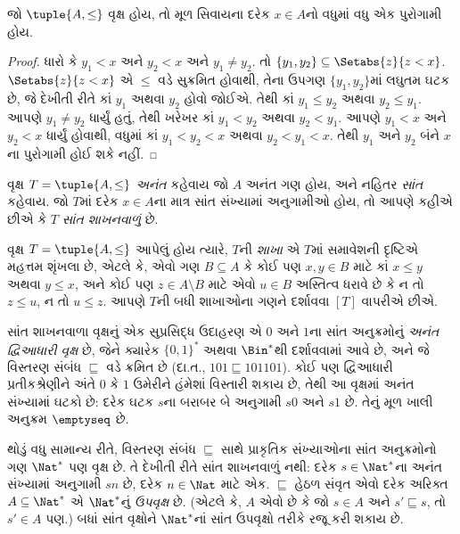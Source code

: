 \documentclass[../../../include/open-logic-section]{subfiles}
\begin{document}
\begin{prop}
જો $\tuple{A,\le}$ વૃક્ષ હોય, તો મૂળ સિવાયના
દરેક $x \in A$નો વધુમાં વધુ એક પુરોગામી હોય.
\end{prop}

\begin{proof}
  ધારો કે $y_1 < x$ અને $y_2 < x$ અને $y_1 \neq y_2$.
  તો $\{y_1, y_2\} \subseteq \Setabs{z}{z<x}$.
  $\Setabs{z}{z<x}$ એ $\le$ વડે સુક્રમિત હોવાથી,
  તેના ઉપગણ $\{y_1, y_2\}$માં લઘુતમ ઘટક છે,
  જે દેખીતી રીતે કાં $y_1$ અથવા $y_2$ હોવો જોઈએ.
  તેથી કાં $y_1 \le y_2$ અથવા $y_2 \le y_1$.
  આપણે $y_1 \neq y_2$ ધાર્યું હતું, તેથી ખરેખર
  કાં $y_1 < y_2$ અથવા $y_2 < y_1$.
  આપણે $y_1 < x$ અને $y_2 < x$ ધાર્યું હોવાથી,
  વધુમાં કાં $y_1 < y_2 < x$ અથવા $y_2 < y_1 < x$.
  તેથી $y_1$ અને $y_2$ બંને $x$ના પુરોગામી હોઈ શકે નહીં.
\end{proof}

\begin{defn}
વૃક્ષ $T = \tuple{A, \le}$ \emph{અનંત} કહેવાય જો $A$
અનંત ગણ હોય, અને નહિતર \emph{સાંત} કહેવાય.
જો $T$માં દરેક $x \in A$ના માત્ર સાંત સંખ્યામાં અનુગામીઓ હોય,
તો આપણે કહીએ છીએ કે $T$ \emph{સાંત શાખનવાળું} છે.
\end{defn}

\begin{defn}[શાખાઓ]
વૃક્ષ $T = \tuple{A, \le}$ આપેલું હોય ત્યારે,
$T$ની \emph{શાખા} એ $T$માં સમાવેશની દૃષ્ટિએ મહત્તમ શૃંખલા છે,
એટલે કે, એવો ગણ $B \subseteq A$ કે કોઈ પણ
$x, y \in B$ માટે કાં $x \le y$ અથવા $y \le x$,
અને કોઈ પણ $z \in A \setminus B$ માટે એવો
$u \in B$ અસ્તિત્વ ધરાવે છે કે ન તો $z \le u$, ન તો $u \le z$.
%
આપણે $T$ની બધી શાખાઓના ગણને દર્શાવવા $[T]$ વાપરીએ છીએ.
\end{defn}

\begin{ex}
સાંત શાખનવાળા વૃક્ષનું એક સુપ્રસિદ્ધ ઉદાહરણ એ $0$ અને $1$ના
સાંત અનુક્રમોનું \emph{અનંત દ્વિઆધારી વૃક્ષ} છે,
જેને ક્યારેક $\{0,1\}^*$ અથવા $\Bin^*$થી દર્શાવવામાં આવે છે,
અને જે વિસ્તરણ સંબંધ $\sqsubseteq$ વડે ક્રમિત છે
(દા.ત., $101 \sqsubseteq 101101$).
કોઈ પણ દ્વિઆધારી પ્રતીકશ્રેણીને અંતે $0$ કે $1$ ઉમેરીને
હંમેશાં વિસ્તારી શકાય છે, તેથી આ વૃક્ષમાં અનંત સંખ્યામાં
ઘટકો છે: દરેક ઘટક $s$ના બરાબર બે અનુગામી $s0$ અને $s1$ છે.
તેનું મૂળ ખાલી અનુક્રમ $\emptyseq$ છે.
\end{ex}

\begin{ex}
થોડું વધુ સામાન્ય રીતે, વિસ્તરણ સંબંધ $\sqsubseteq$ સાથે
પ્રાકૃતિક સંખ્યાઓના સાંત અનુક્રમોનો ગણ $\Nat^*$ પણ વૃક્ષ છે.
તે દેખીતી રીતે સાંત શાખનવાળું નથી: દરેક $s \in \Nat^*$ના
અનંત સંખ્યામાં અનુગામી $sn$ છે, દરેક $n \in \Nat$ માટે એક.
$\sqsubseteq$ હેઠળ સંવૃત એવો દરેક અરિક્ત $A \subseteq \Nat^*$
એ $\Nat^*$નું \emph{ઉપવૃક્ષ} છે.
(એટલે કે, $A$ એવો છે કે જો $s \in A$ અને
$s' \sqsubseteq s$, તો $s' \in A$ પણ.)
બધાં સાંત વૃક્ષોને $\Nat^*$નાં સાંત ઉપવૃક્ષો તરીકે રજૂ કરી શકાય છે.
\end{ex}
\end{document}
